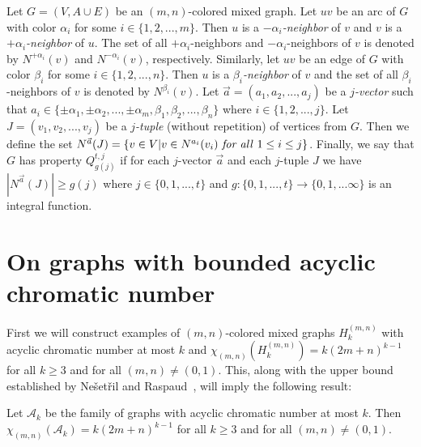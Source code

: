 \documentclass[11pt]{article}
\begin{document}
Let $G = (V, A \cup E)$ be an $(m,n)$-colored mixed graph. Let $uv$ be an arc of $G$ with color $\alpha_i$ for some $i \in \{1,2,...,m\}$. 
Then $u$ is a
\textit{$-\alpha_i$-neighbor} of $v$ and $v$ is a \textit{$+\alpha_i$-neighbor} of $u$. The set of all $+\alpha_i$-neighbors 
and $-\alpha_i$-neighbors of $v$ is denoted by $N^{+\alpha_i}(v)$ and $N^{-\alpha_i}(v)$, respectively. Similarly, 
let $uv$ be an edge of $G$ with color $\beta_i$ for some $i \in \{1,2,...,n\}$. Then $u$ is a
\textit{$\beta_i$-neighbor} of $v$ and the set of all $\beta_i$-neighbors of $v$ is denoted by $N^{\beta_i}(v)$.
Let $\vec{a} = (a_1, a_2, ..., a_j)$ be a \textit{$j$-vector} such that 
$a_i \in \{\pm \alpha_1, \pm \alpha_2, ...,  \pm \alpha_m,  \beta_1, \beta_2, ..., \beta_n\}$ where $i \in \{1,2,...,j\}$. 
Let $J = (v_1, v_2, ..., v_j)$ be a \textit{$j$-tuple} (without repetition) of  vertices  from $G$. Then we define the set 
$N^{\vec{a}}(J) = \{v \in V | v \in N^{a_i}(v_i) \text{ \textit{for all} } 1 \leq i \leq j\} $. 
Finally, we say that $G$ has property $Q^{t,j}_{g(j)}$ if for each $j$-vector $\vec{a}$ and each $j$-tuple $J$ we have 
$|N^{\vec{a}}(J)| \geq g(j)$ where $j \in \{0,1,...,t\}$ and $g: \{0,1,...,t\} \rightarrow \{0,1,... \infty\}$ is an integral function. 
  
  
  \section{On graphs with bounded acyclic chromatic number}\label{sec acyclic}
  First we will construct examples of $(m,n)$-colored mixed graphs $H_k^{(m,n)}$ with acyclic chromatic number at most $k$ and 
  $\chi_{(m,n)}(H_k^{(m,n)}) = k(2m+n)^{k-1}$ for all $k \geq 3$ and for all $(m,n) \neq (0,1)$. This, along with the upper bound established by Ne\v{s}et\v{r}il and Raspaud~\cite{raspaud_and_nesetril}, will imply the following result:
  
  
  \begin{theorem}\label{acyclic-chromatic}
  Let $\mathcal{A}_k$ be the family of graphs with acyclic chromatic number at most $k$. 
  Then $\chi_{(m,n)}(\mathcal{A}_k) = k(2m+n)^{k-1}$ for all $k \geq 3$ and for all $(m,n) \neq (0,1)$. 
  \end{theorem}
  
\end{document}

